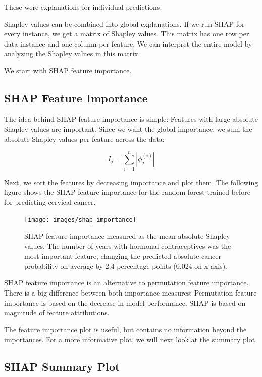 \documentclass[12pt,]{krantz}
\begin{document}
These were explanations for individual predictions.

Shapley values can be combined into global explanations. If we run SHAP
for every instance, we get a matrix of Shapley values. This matrix has
one row per data instance and one column per feature. We can interpret
the entire model by analyzing the Shapley values in this matrix.

We start with SHAP feature importance.

\subsection{SHAP Feature Importance}\label{shap-feature-importance}

The idea behind SHAP feature importance is simple: Features with large
absolute Shapley values are important. Since we want the global
importance, we sum the absolute Shapley values per feature across the
data:

\[I_j=\sum_{i=1}^n{}|\phi_j^{(i)}|\]

Next, we sort the features by decreasing importance and plot them. The
following figure shows the SHAP feature importance for the random forest
trained before for predicting cervical cancer.

\begin{figure}

{\centering \texttt{[image: images/shap-importance]} 

}

\caption{SHAP feature importance measured as the mean absolute Shapley values. The number of years with hormonal contraceptives was the most important feature, changing the predicted absolute cancer probability on average by 2.4 percentage points (0.024 on x-axis).}\label{fig:unnamed-chunk-45}
\end{figure}

SHAP feature importance is an alternative to
\protect\hyperlink{feature-importance}{permutation feature importance}.
There is a big difference between both importance measures: Permutation
feature importance is based on the decrease in model performance. SHAP
is based on magnitude of feature attributions.

The feature importance plot is useful, but contains no information
beyond the importances. For a more informative plot, we will next look
at the summary plot.

\subsection{SHAP Summary Plot}\label{shap-summary-plot}
\end{document}
